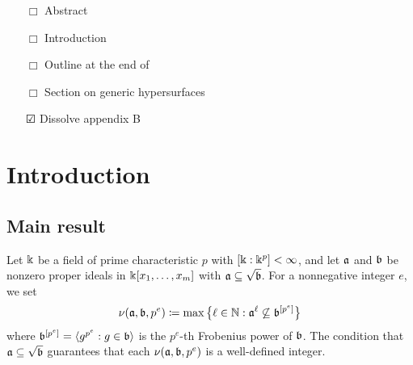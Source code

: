 \documentclass{amsart}
\begin{document}
{\begin{enumerate}
 \item[$\Box$] Abstract
 \item[$\Box$] Introduction
 \item[$\Box$] Outline at the end of 
 \item[$\Box$] Section on generic hypersurfaces
 \item[$\CheckedBox$] Dissolve appendix B
   \end{enumerate}
}

\setcounter{tocdepth}{1}
\tableofcontents

\section{Introduction}

\subsection{Main result}
Let $\Bbbk$ be a field of prime characteristic $p$ with $[\Bbbk:\Bbbk^p] < \infty$, and let $\mathfrak{a}$ and $\mathfrak{b}$ be nonzero proper ideals in $\Bbbk[x_1,\ldots,x_m]$ with $\mathfrak{a} \subseteq \sqrt {\mathfrak{b}}$.
For a nonnegative integer $e$, we set
\begin{equation}
   \nu(\mathfrak{a},\mathfrak{b},p^e) \coloneqq \max\big\{\ell\in \mathbb{N} : \mathfrak{a}^{\ell} \not\subseteq \mathfrak{b}^{[p^e]}\big\}
   \label{eq: nu definition}
\end{equation}
where $\mathfrak{b}^{[p^e]} = \langle g^{p^e} : g \in \mathfrak{b} \rangle$ is the $p^e$-th Frobenius power of $\mathfrak{b}$.
The condition that $\mathfrak{a} \subseteq \sqrt {\mathfrak{b}}$ guarantees that each $\nu(\mathfrak{a}, \mathfrak{b}, p^e)$ is a well-defined integer.
\end{document}

